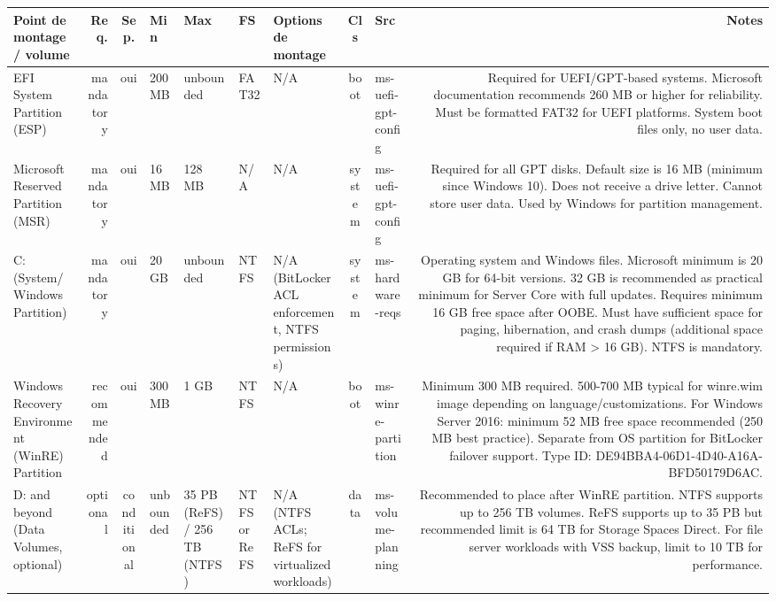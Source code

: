 \documentclass[10pt,a4paper]{article}
\renewcommand{\arraystretch}{1.2}
\begin{document}
{\renewcommand{\arraystretch}{1.15}\begin{longtable}{M R S Z Z T O C I N}\toprule\textbf{\normalfont\scriptsize Point de montage / volume} & \textbf{\normalfont\scriptsize Req.} & \textbf{\normalfont\scriptsize Sep.} & \textbf{\normalfont\scriptsize Min} & \textbf{\normalfont\scriptsize Max} & \textbf{\normalfont\scriptsize FS} & \textbf{\normalfont\scriptsize Options de montage} & \textbf{\normalfont\scriptsize Cls} & \textbf{\normalfont\scriptsize Src} & \textbf{\normalfont\scriptsize Notes}\\\midrule\endhead
EFI System Partition (ESP) & \textcolor{cBlock}{mandatory} & \textcolor{cOk}{oui} & 200 MB & unbounded & FAT32 & N/A & boot & ms-uefi-gpt-config & Required for UEFI/GPT-based systems. Microsoft documentation recommends 260 MB or higher for reliability. Must be formatted FAT32 for UEFI platforms. System boot files only, no user data.\\
Microsoft Reserved Partition (MSR) & \textcolor{cBlock}{mandatory} & \textcolor{cOk}{oui} & 16 MB & 128 MB & N/A & N/A & system & ms-uefi-gpt-config & Required for all GPT disks. Default size is 16 MB (minimum since Windows 10). Does not receive a drive letter. Cannot store user data. Used by Windows for partition management.\\
C: (System/Windows Partition) & \textcolor{cBlock}{mandatory} & \textcolor{cOk}{oui} & 20 GB & unbounded & NTFS & N/A (BitLocker ACL enforcement, NTFS permissions) & system & ms-hardware-reqs & Operating system and Windows files. Microsoft minimum is 20 GB for 64-bit versions. 32 GB is recommended as practical minimum for Server Core with full updates. Requires minimum 16 GB free space after OOBE. Must have sufficient space for paging, hibernation, and crash dumps (additional space required if RAM > 16 GB). NTFS is mandatory.\\
Windows Recovery Environment (WinRE) Partition & \textcolor{cHigh}{recommended} & \textcolor{cOk}{oui} & 300 MB & 1 GB & NTFS & N/A & boot & ms-winre-partition & Minimum 300 MB required. 500-700 MB typical for winre.wim image depending on language/customizations. For Windows Server 2016: minimum 52 MB free space recommended (250 MB best practice). Separate from OS partition for BitLocker failover support. Type ID: DE94BBA4-06D1-4D40-A16A-BFD50179D6AC.\\
D: and beyond (Data Volumes, optional) & \textcolor{cLow}{optional} & conditional & unbounded & 35 PB (ReFS) / 256 TB (NTFS) & NTFS or ReFS & N/A (NTFS ACLs; ReFS for virtualized workloads) & data & ms-volume-planning & Recommended to place after WinRE partition. NTFS supports up to 256 TB volumes. ReFS supports up to 35 PB but recommended limit is 64 TB for Storage Spaces Direct. For file server workloads with VSS backup, limit to 10 TB for performance.\\
\bottomrule\end{longtable}}
\end{document}
